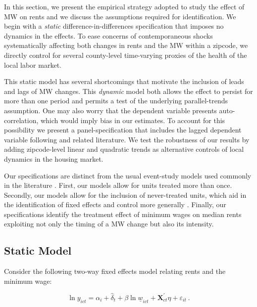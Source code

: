 
In this section, we present the empirical strategy adopted to study the effect of MW 
on rents and we discuss the assumptions required for identification. 
We begin with a \textit{static} difference-in-differences specification 
that imposes no dynamics in the effects. To ease concerns of contemporaneous shocks 
systematically affecting both changes in rents and the MW within a zipcode, we 
directly control for several county-level time-varying proxies of the health of the 
local labor market.

This static model has several shortcomings that motivate the inclusion of leads and 
lags of MW changes. This \textit{dynamic} model both allows the effect to persist for 
more than one period and permits a test of the underlying parallel-trends assumption. 
One may also worry that the dependent variable presents auto-correlation, which would 
imply bias in our estimates. To account for this possibility we present a 
panel-specification that includes the lagged dependent variable following 
\textcite{ArellanoBond1991} and related literature. We test the robustness of our 
results by adding zipcode-level linear and quadratic trends as alternative
controls of local dynamics in the housing market. 

Our specifications are distinct from the usual event-study models used commonly 
in the literature \parencite[discussed in, e.g.,][]{BorusyakJaravel2017, 
abraham2018}. First, our models allow for 
units treated more than once. Secondly, 
our models allow for the inclusion of never-treated units, which aid in the 
identification of fixed effects and control more generally
\parencite{BorusyakJaravel2017}. Finally, our specifications identify the treatment 
effect of minimum wages on median rents exploiting not only the timing of a MW change 
but also its intensity.
    
\subsection{Static Model}
Consider the following two-way fixed effects model relating rents and the minimum wage:

\begin{equation*} \label{eq:did_lev}
    \ln y_{ict} = \alpha_i + \hat{\delta}_t 
    			+ \beta \ln \underline{w}_{ict}
    			+ \mathbf{X}^{'}_{ct}\eta
    			+ \varepsilon_{it} \ .
\end{equation*}    

